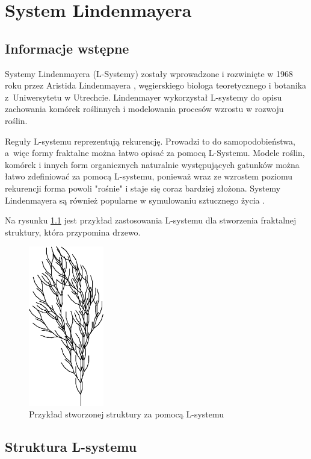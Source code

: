 \documentclass[a4paper,twoside,12pt]{report}
\begin{document}


\chapter{System Lindenmayera} 


\section{Informacje wstępne}

Systemy Lindenmayera (L-Systemy) zostały wprowadzone i rozwinięte w 1968 roku
 przez Aristida Lindenmayera \cite{modelingOfPlants},
węgierskiego biologa teoretycznego i botanika z~Uniwersytetu w Utrechcie.
Lindenmayer wykorzystał L-systemy do opisu zachowania komórek roślinnych i
modelowania procesów wzrostu w rozwoju roślin.

Reguły L-systemu reprezentują rekurencję.
Prowadzi to do samopodobieństwa, a~więc formy fraktalne można łatwo opisać za pomocą L-Systemu.
Modele roślin, komórek i innych form organicznych naturalnie występujących gatunków można łatwo zdefiniować za pomocą L-systemu,
ponieważ wraz ze wzrostem poziomu rekurencji forma powoli "rośnie" i staje się coraz bardziej złożona.
Systemy Lindenmayera są również popularne w symulowaniu sztucznego życia \cite{neuralStructures}.

Na rysunku \ref{fig:lsystreeexample} jest przykład zastosowania L-systemu dla stworzenia 
fraktalnej struktury, która przypomina drzewo.


\begin{figure}[H]
	\centering\includegraphics[height=7cm]{grafika/treefirst}
	\caption{Przykład stworzonej struktury za pomocą L-systemu}
    \label{fig:lsystreeexample}
\end{figure}

\section{Struktura L-systemu}
\end{document}
